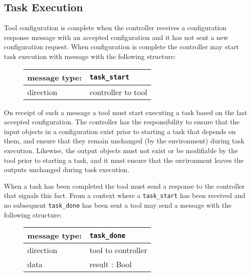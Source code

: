 \documentclass{article}
\newcommand{\msg}[1]{\texttt{#1}}
\begin{document}
  \subsection{Task Execution} \label{ss::task_execution}

   \noindent Tool configuration is complete when the controller receives a
   configuration response message with an accepted configuration and it has not
   sent a new configuration request.  When configuration is complete the
   controller may start task execution with message with the following
   structure: 

   \begin{figure}[H]
    \begin{center}
     \begin{tabular}{|ll|}
      \hline
       message type:   & \msg{task\_start} \\
      \hline
       direction       & controller to tool \\
      \hline
     \end{tabular}
    \end{center}
   \end{figure}

   \noindent On receipt of such a message a tool must start executing a task
   based on the last accepted configuration. The controller has the
   responsibility to ensure that the input objects in a configuration exist
   prior to starting a task that depends on them, and ensure that they remain
   unchanged (by the environment) during task execution. Likewise, the output
   objects must not exist or be modifiable by the tool prior to starting a
   task, and it must ensure that the environment leaves the outputs unchanged
   during task execution.

   When a task has been completed the tool must send a response to the
   controller that signals this fact. From a context where a \msg{task\_start}
   has been received and no subsequent \msg{task\_done} has been sent a tool
   may send a message with the following structure:

   \begin{figure}[H]
    \begin{center}
     \begin{tabular}{|ll|}
      \hline
       message type:   & \msg{task\_done} \\
      \hline
       direction       & tool to controller \\
       data            & result : Bool \\
      \hline
     \end{tabular}
    \end{center}
   \end{figure}
\end{document}
